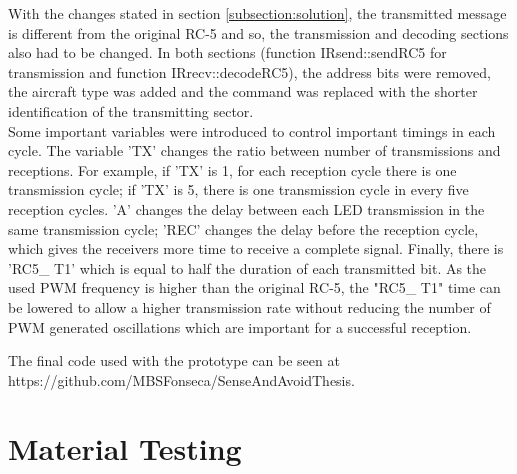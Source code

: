 With the changes stated in section \ref{subsection:solution}, the transmitted message is different from the original RC-5 and so, the transmission and decoding sections also had to be changed. In both sections (function IRsend::sendRC5 for transmission and function IRrecv::decodeRC5), the address bits were removed, the aircraft type was added and the command was replaced with the shorter identification of the transmitting sector.\\

Some important variables were introduced to control important timings in each cycle. The variable 'TX' changes the ratio between number of transmissions and receptions. For example, if 'TX' is 1, for each reception cycle there is one transmission cycle; if 'TX' is 5, there is one transmission cycle in every five reception cycles. 'A' changes the delay between each LED transmission in the same transmission cycle; 'REC' changes the delay before the reception cycle, which gives the receivers more time to receive a complete signal. Finally, there is 'RC5\_ T1' which is equal to half the duration of each transmitted bit. As the used PWM frequency is higher than the original RC-5, the "RC5\_ T1" time can be lowered to allow a higher transmission rate without reducing the number of PWM generated oscillations which are important for a successful reception.

The final code used with the prototype can be seen at https://github.com/MBSFonseca/SenseAndAvoidThesis.\\

\section{Material Testing}
\label{section:materialtesting}

